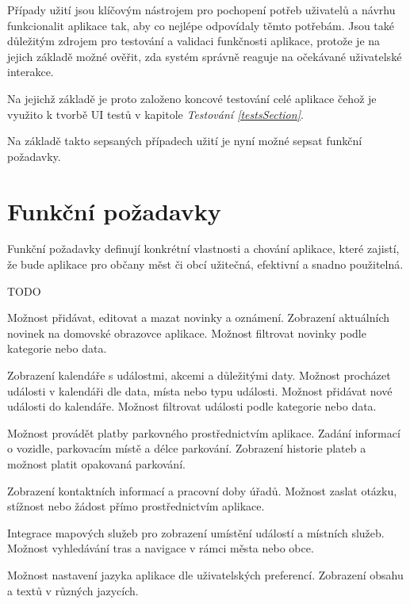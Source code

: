 Případy užití jsou klíčovým nástrojem pro pochopení potřeb uživatelů a návrhu funkcionalit aplikace tak, aby co nejlépe odpovídaly těmto potřebám. 
Jsou také důležitým zdrojem pro testování a validaci funkčnosti aplikace, protože je na jejich základě možné ověřit, zda systém správně reaguje na očekávané 
uživatelské interakce. 

Na jejichž základě je proto založeno koncové testování celé aplikace čehož je využito k tvorbě UI testů v kapitole \textit{Testování \ref{testsSection}}.

Na základě takto sepsaných případech užití je nyní možné sepsat funkční požadavky.

\section{Funkční požadavky}
Funkční požadavky definují konkrétní vlastnosti a chování aplikace, které zajistí, že bude aplikace pro občany měst či obcí 
užitečná, efektivní a snadno použitelná.

TODO

Možnost přidávat, editovat a mazat novinky a oznámení.
Zobrazení aktuálních novinek na domovské obrazovce aplikace.
Možnost filtrovat novinky podle kategorie nebo data.

Zobrazení kalendáře s událostmi, akcemi a důležitými daty.
Možnost procházet události v kalendáři dle data, místa nebo typu události.
Možnost přidávat nové události do kalendáře.
Možnost filtrovat události podle kategorie nebo data.

Možnost provádět platby parkovného prostřednictvím aplikace.
Zadání informací o vozidle, parkovacím místě a délce parkování.
Zobrazení historie plateb a možnost platit opakovaná parkování.

Zobrazení kontaktních informací a pracovní doby úřadů.
Možnost zaslat otázku, stížnost nebo žádost přímo prostřednictvím aplikace.

Integrace mapových služeb pro zobrazení umístění událostí a místních služeb.
Možnost vyhledávání tras a navigace v rámci města nebo obce.

Možnost nastavení jazyka aplikace dle uživatelských preferencí.
Zobrazení obsahu a textů v různých jazycích.

